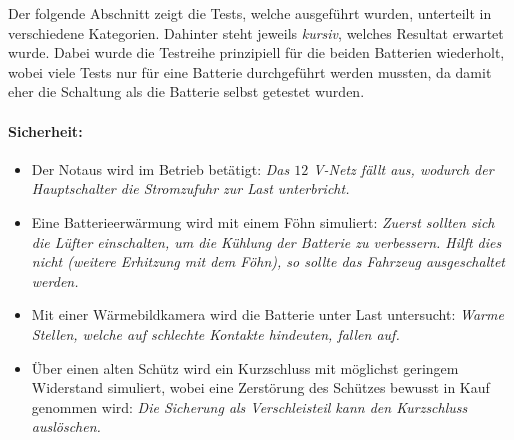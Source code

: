 Der folgende Abschnitt zeigt die Tests, welche ausgeführt wurden, unterteilt in verschiedene Kategorien. Dahinter steht jeweils \textit{kursiv}, welches Resultat erwartet wurde. Dabei wurde die Testreihe prinzipiell für die beiden Batterien wiederholt, wobei viele Tests nur für eine Batterie durchgeführt werden mussten, da damit eher die Schaltung als die Batterie selbst getestet wurden.

\paragraph{Sicherheit:} \begin{itemize}
	\item Der Notaus wird im Betrieb betätigt: \textit{Das $12$ V-Netz fällt aus, wodurch der Hauptschalter die Stromzufuhr zur Last unterbricht.}
	\item Eine Batterieerwärmung wird mit einem Föhn simuliert: \textit{Zuerst sollten sich die Lüfter einschalten, um die Kühlung der Batterie zu verbessern. Hilft dies nicht (weitere Erhitzung mit dem Föhn), so sollte das Fahrzeug ausgeschaltet werden.}
	\item Mit einer Wärmebildkamera wird die Batterie unter Last untersucht: \textit{Warme Stellen, welche auf schlechte Kontakte hindeuten, fallen auf.}
	\item Über einen alten Schütz wird ein Kurzschluss mit möglichst geringem Widerstand simuliert, wobei eine Zerstörung des Schützes bewusst in Kauf genommen wird: \textit{Die Sicherung als Verschleisteil kann den Kurzschluss auslöschen.}
\end{itemize}

